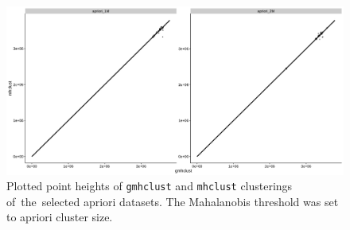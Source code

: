 \begin{figure}\centering
	\includegraphics[width=\linewidth]{img/apriori_result}
	\caption{Plotted point heights of \texttt{gmhclust} and \texttt{mhclust} clusterings of~the~selected apriori datasets. The Mahalanobis threshold was set to apriori cluster size.}
	\label{fig04:apriori_result}
\end{figure}

